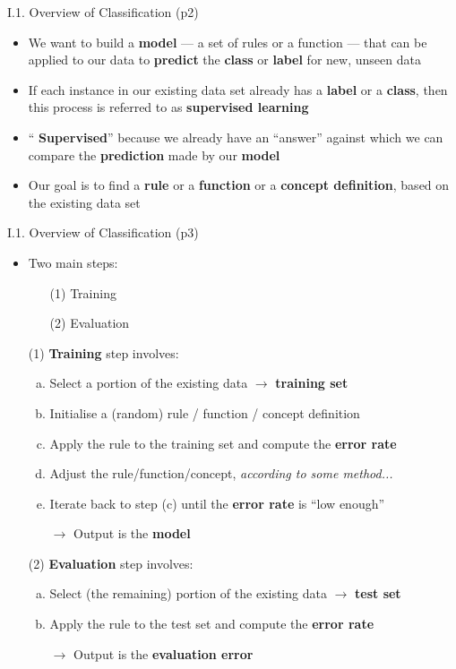 \documentclass[handout]{beamer}
\newcommand{\strong}[1]{\textbf{\color{teal} #1}}
\newcommand{\stronger}[1]{\textbf{\color{purple} #1}}
\begin{document}
\begin{frame}{I.1. Overview of Classification (p2)}
\begin{itemize}
\item We want to build a \stronger{model} --- a set of rules or a function --- that can be applied to our data to \strong{predict} the \strong{class} or \strong{label} for new, unseen data
\item If each instance in our existing data set already has a \strong{label} or a \strong{class}, then this process is referred to as \stronger{supervised learning}
\item ``\stronger{Supervised}'' because we already have an ``answer'' against which we can compare the \strong{prediction} made by our \strong{model}
\item Our goal is to find a \stronger{rule} or a \stronger{function} or a \stronger{concept definition}, based on the existing data set
\end{itemize}
\end{frame}
\begin{frame}{I.1. Overview of Classification (p3)}
\begin{itemize}
\item Two main steps:
	\begin{itemize}
	\item[(1)] Training
	\item[(2)] Evaluation
	\end{itemize}
\item[]
\item[(1)] \stronger{Training} step involves:
	\begin{enumerate}[(a)] 
	\item Select a portion of the existing data $\rightarrow$ \strong{training set}
	\item Initialise a (random) rule / function / concept definition
	\item Apply the rule to the training set and compute the \strong{error rate}
	\item Adjust the rule/function/concept, \emph{according to some method...}
	\item Iterate back to step {\color{beamer@blendedblue}(c)} until the \strong{error rate} is ``low enough''
	\item[$\rightarrow$] Output is the \stronger{model}
	\end{enumerate}
\item[]
\item[(2)] \stronger{Evaluation} step involves:
	\begin{enumerate}[(a)]
	\item Select (the remaining) portion of the existing data $\rightarrow$ \strong{test set}
	\item Apply the rule to the test set and compute the \strong{error rate}
	\item[$\rightarrow$] Output is the \stronger{evaluation error}
	\end{enumerate}
\end{itemize}
\end{frame}
\end{document}
